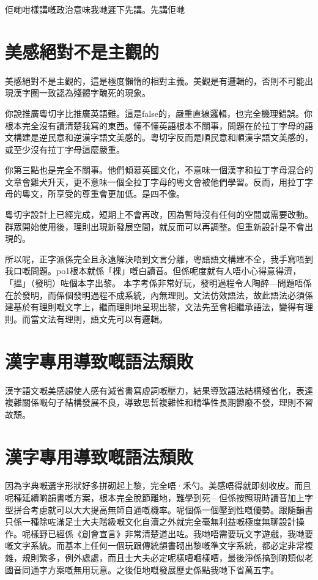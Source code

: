 \documentclass[a5paper, 10pt, openany]{book} %
\begin{document}
佢哋咁樣講嘅政治意味我哋遲下先講。先講佢哋



\chapter{美感絕對不是主觀的}

美感絕對不是主觀的，這是極度懶惰的相對主義。美觀是有邏輯的，否則不可能出現漢字圈一致認為殘體字醜死的現象。

你說推廣粵切字比推廣英語難。這是false的，嚴重直線邏輯，也完全機理錯誤。你根本完全沒有讀清楚我寫的東西。懂不懂英語根本不關事，問題在於拉丁字母的語文構建是逆民意和逆漢字語文美感的。粵切字反而是順民意和順漢字語文美感的，或至少沒有拉丁字母這麼嚴重。

你第三點也是完全不關事。他們傾慕英國文化，不意味一個漢字和拉丁字母混合的文章會雞犬升天，更不意味一個全拉丁字母的粵文會被他們學習。反而，用拉丁字母的粵文，所享受的尊重會更加低。是四不像。

粵切字設計上已經完成，短期上不會再改，因為暫時沒有任何的空間或需要改動。群眾開始使用後，理則出現新發展空間，就反而可以再調整。但重新設計是不會出現的。

所以呢，正字派係完全且永遠解決唔到文言分離，粵語語文構建不全，我手寫唔到我口嘅問題。po1根本就係「棵」嘅白讀音。但係呢度就有人唔小心得意得濟，「搵」（發明）咗個本字出黎。
本字考係非常好玩，發明過程令人陶醉—問題唔係在於發明，而係個發明過程不成系統，內無理則。文法仿效語法，故此語法必須係建基於有理則嘅文字上，繼而理則地呈現出黎，文法先至會相繼承語法，變得有理則。而當文法有理則，語文先可以有邏輯。


\chapter{漢字專用導致嘅語法頹敗}
漢字語文嘅美感趨使人感有減省書寫虛詞嘅壓力，結果導致語法結構殘省化，表達複雜關係嘅句子結構發展不良，導致思哲複雜性和精準性長期鬰廢不發，理則不習故頹。

\chapter{漢字專用導致嘅語法頹敗}
因為字典嘅選字形狀好多拼砌起上黎，完全唔·禾勺。美感唔得就即刻收皮。而且呢種延續啲韻書嘅方案，根本完全脫節離地，難學到死—但係按照現時讀音加上字型拼合考慮就可以大大提高無師自通嘅機率。呢個係一個壓到性嘅優勢。跟隨韻書只係一種除咗滿足士大夫階級嘅文化自瀆之外就完全毫無利益嘅極度無聊設計操作。呢樣野已經係《創會宣言》非常清楚道出咗。我哋唔需要玩文字遊戲，我哋要嘅文字系統。而基本上任何一個玩跟傳統韻書砌出黎嘅準文字系統，都必定非常複雜，規則繁多，例外處處，而且士大夫必定呢樣嘈嗰樣嘈，最後淨係搞到啲類似老國音同通字方案嘅無用玩意。之後佢地嘅發展歷史係點我哋下省萬五字。
\end{document}
